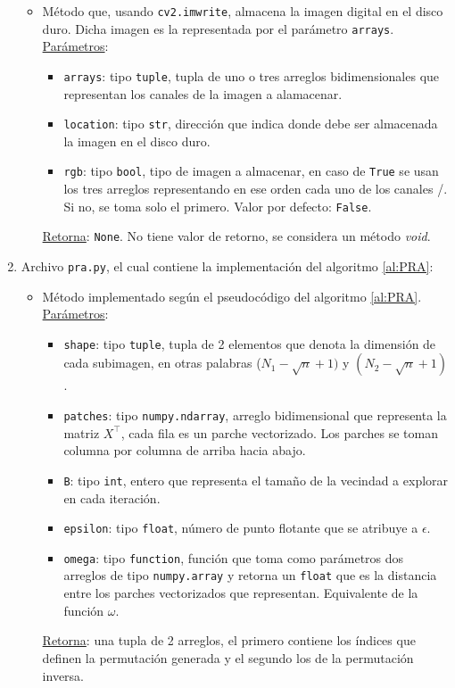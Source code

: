 \begin{enumerate}
\begin{itemize}
		\item {}
		
		M\'etodo que, usando \texttt{cv2.imwrite}, almacena la imagen digital en el disco duro. Dicha imagen es la representada por el par\'ametro \texttt{arrays}. \underline{Par\'ametros}:
		\begin{itemize}
			\item \texttt{arrays}: tipo \texttt{tuple}, tupla de uno o tres arreglos bidimensionales que representan los canales de la imagen a alamacenar.
			\item \texttt{location}: tipo \texttt{str}, direcci\'on que indica donde debe ser almacenada la imagen en el disco duro.
			\item \texttt{rgb}: tipo \texttt{bool}, tipo de imagen a almacenar, en caso de \texttt{True} se usan los tres arreglos representando en ese orden cada uno de los canales \RGB/. Si no, se toma solo el primero. Valor por defecto: \texttt{False}. 
		\end{itemize}
		\underline{Retorna}: \texttt{None}. No tiene valor de retorno, se considera un m\'etodo \textit{void}.
	\end{itemize}
	
	\item Archivo \texttt{pra.py}, el cual contiene la implementaci\'on del algoritmo \ref{al:PRA}:
	\begin{itemize}
		\item {}
		
		M\'etodo implementado seg\'un el pseudoc\'odigo del algoritmo \ref{al:PRA}. \underline{Par\'ametros}:
		\begin{itemize}
			\item \texttt{shape}: tipo \texttt{tuple}, tupla de 2 elementos que denota la dimensi\'on de cada subimagen, en otras palabras ($N_1 - \sqrt{n} + 1)$ y $(N_2 - \sqrt{n} + 1)$.
			\item \texttt{patches}: tipo \texttt{numpy.ndarray}, arreglo bidimensional que representa la matriz $X^\intercal$, cada fila es un parche vectorizado. Los parches se toman columna por columna de arriba hacia abajo.
			\item \texttt{B}: tipo \texttt{int}, entero que representa el tamaño de la vecindad a explorar en cada iteraci\'on.
			\item \texttt{epsilon}: tipo \texttt{float}, n\'umero de punto flotante que se atribuye a $\epsilon$.
			\item \texttt{omega}: tipo \texttt{function}, funci\'on que toma como par\'ametros dos arreglos de tipo \texttt{numpy.array} y retorna un \texttt{float} que es la distancia entre los parches vectorizados que representan. Equivalente de la funci\'on $\omega$.
		\end{itemize}
		\underline{Retorna}: una tupla de 2 arreglos, el primero contiene los \'indices que definen la permutaci\'on generada y el segundo los de la permutaci\'on inversa.
	\end{itemize}
	

\end{enumerate}
